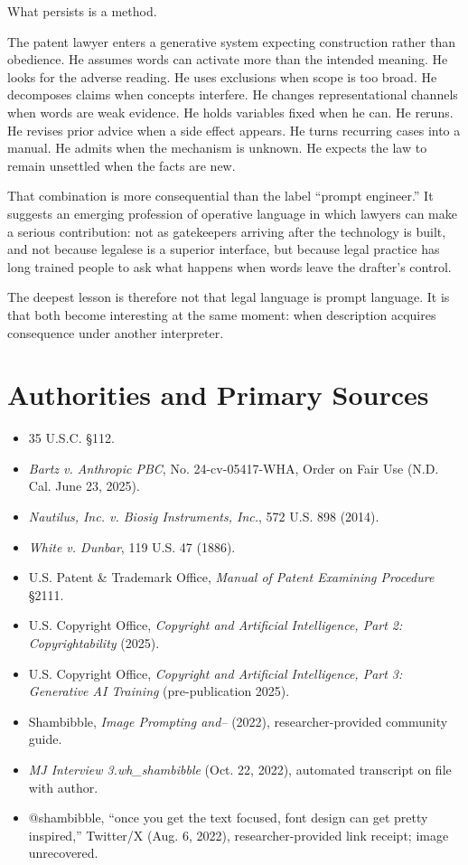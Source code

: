 \documentclass[11pt]{article}
\begin{document}
What persists is a method.

The patent lawyer enters a generative system expecting construction rather than obedience. He assumes words can activate more than the intended meaning. He looks for the adverse reading. He uses exclusions when scope is too broad. He decomposes claims when concepts interfere. He changes representational channels when words are weak evidence. He holds variables fixed when he can. He reruns. He revises prior advice when a side effect appears. He turns recurring cases into a manual. He admits when the mechanism is unknown. He expects the law to remain unsettled when the facts are new.

That combination is more consequential than the label ``prompt engineer.'' It suggests an emerging profession of operative language in which lawyers can make a serious contribution: not as gatekeepers arriving after the technology is built, and not because legalese is a superior interface, but because legal practice has long trained people to ask what happens when words leave the drafter's control.

The deepest lesson is therefore not that legal language is prompt language. It is that both become interesting at the same moment: when description acquires consequence under another interpreter.

\section*{Authorities and Primary Sources}
\begin{itemize}[leftmargin=1.5em]
\item 35 U.S.C. \S 112.
\item \emph{Bartz v. Anthropic PBC}, No. 24-cv-05417-WHA, Order on Fair Use (N.D. Cal. June 23, 2025).
\item \emph{Nautilus, Inc. v. Biosig Instruments, Inc.}, 572 U.S. 898 (2014).
\item \emph{White v. Dunbar}, 119 U.S. 47 (1886).
\item U.S. Patent \& Trademark Office, \emph{Manual of Patent Examining Procedure} \S 2111.
\item U.S. Copyright Office, \emph{Copyright and Artificial Intelligence, Part 2: Copyrightability} (2025).
\item U.S. Copyright Office, \emph{Copyright and Artificial Intelligence, Part 3: Generative AI Training} (pre-publication 2025).
\item Shambibble, \emph{Image Prompting and--} (2022), researcher-provided community guide.
\item \emph{MJ Interview 3.wh\_shambibble} (Oct. 22, 2022), automated transcript on file with author.
\item @shambibble, ``once you get the text focused, font design can get pretty inspired,'' Twitter/X (Aug. 6, 2022), researcher-provided link receipt; image unrecovered.
\end{itemize}
\end{document}
